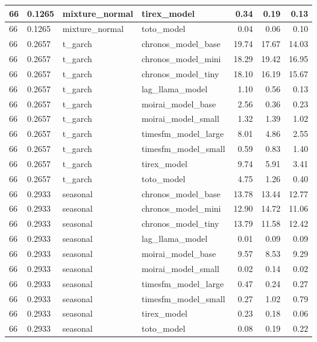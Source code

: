 {\begin{tabular}{llllrrr}
\midrule
66 & 0.1265 & mixture\_normal & tirex\_model & 0.34 & 0.19 & 0.13 \\
\midrule
66 & 0.1265 & mixture\_normal & toto\_model & 0.04 & 0.06 & 0.10 \\
\midrule
66 & 0.2657 & t\_garch & chronos\_model\_base & 19.74 & 17.67 & 14.03 \\
\midrule
66 & 0.2657 & t\_garch & chronos\_model\_mini & 18.29 & 19.42 & 16.95 \\
\midrule
66 & 0.2657 & t\_garch & chronos\_model\_tiny & 18.10 & 16.19 & 15.67 \\
\midrule
66 & 0.2657 & t\_garch & lag\_llama\_model & 1.10 & 0.56 & 0.13 \\
\midrule
66 & 0.2657 & t\_garch & moirai\_model\_base & 2.56 & 0.36 & 0.23 \\
\midrule
66 & 0.2657 & t\_garch & moirai\_model\_small & 1.32 & 1.39 & 1.02 \\
\midrule
66 & 0.2657 & t\_garch & timesfm\_model\_large & 8.01 & 4.86 & 2.55 \\
\midrule
66 & 0.2657 & t\_garch & timesfm\_model\_small & 0.59 & 0.83 & 1.40 \\
\midrule
66 & 0.2657 & t\_garch & tirex\_model & 9.74 & 5.91 & 3.41 \\
\midrule
66 & 0.2657 & t\_garch & toto\_model & 4.75 & 1.26 & 0.40 \\
\midrule
66 & 0.2933 & seasonal & chronos\_model\_base & 13.78 & 13.44 & 12.77 \\
\midrule
66 & 0.2933 & seasonal & chronos\_model\_mini & 12.90 & 14.72 & 11.06 \\
\midrule
66 & 0.2933 & seasonal & chronos\_model\_tiny & 13.79 & 11.58 & 12.42 \\
\midrule
66 & 0.2933 & seasonal & lag\_llama\_model & 0.01 & 0.09 & 0.09 \\
\midrule
66 & 0.2933 & seasonal & moirai\_model\_base & 9.57 & 8.53 & 9.29 \\
\midrule
66 & 0.2933 & seasonal & moirai\_model\_small & 0.02 & 0.14 & 0.02 \\
\midrule
66 & 0.2933 & seasonal & timesfm\_model\_large & 0.47 & 0.24 & 0.27 \\
\midrule
66 & 0.2933 & seasonal & timesfm\_model\_small & 0.27 & 1.02 & 0.79 \\
\midrule
66 & 0.2933 & seasonal & tirex\_model & 0.23 & 0.18 & 0.06 \\
\midrule
66 & 0.2933 & seasonal & toto\_model & 0.08 & 0.19 & 0.22 \\
\midrule

\end{tabular}}

